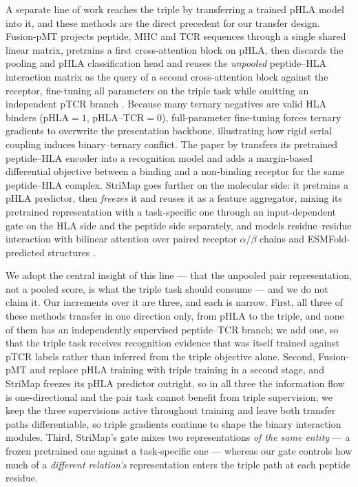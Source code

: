 \documentclass[webpdf,modern,large,namedate]{oup-authoring-template}
\theoremstyle{thmstyleone}
\theoremstyle{thmstyletwo}
\theoremstyle{thmstylethree}
\newcommand{\PH}{pHLA}
\newcommand{\PT}{pTCR}
\newcommand{\PHT}{pHLA--TCR}
\begin{document}
A separate line of work reaches the triple by transferring a trained \PH{}
model into it, and these methods are the direct precedent for our transfer
design. Fusion-pMT projects peptide, MHC and TCR sequences through a single
shared linear matrix, pretrains a first cross-attention block on \PH{}, then
discards the pooling and \PH{} classification head and reuses the
\emph{unpooled} peptide--HLA interaction matrix as the query of a second
cross-attention block against the receptor, fine-tuning all parameters on the
triple task while omitting an independent \PT{} branch \citep{ma2025fusionpmt}.
Because many ternary negatives are valid HLA binders (\PH{}$=1$, \PHT{}$=0$),
full-parameter fine-tuning forces ternary gradients to overwrite the
presentation backbone, illustrating how rigid serial coupling induces
binary--ternary conflict. The
paper by \citet{niu2025attention} transfers its pretrained peptide--HLA encoder
into a recognition model and adds a margin-based differential objective between
a binding and a non-binding receptor for the same peptide--HLA complex. StriMap
goes further on the molecular side: it pretrains a \PH{} predictor, then
\emph{freezes} it and reuses it as a feature aggregator, mixing its pretrained
representation with a task-specific one through an input-dependent gate on the
HLA side and the peptide side separately, and models residue--residue
interaction with bilinear attention over paired receptor $\alpha$/$\beta$
chains and ESMFold-predicted structures \citep{cao2026strimap}.

We adopt the central insight of this line --- that the unpooled pair
representation, not a pooled score, is what the triple task should consume ---
and we do not claim it. Our increments over it are three, and each is narrow.
First, all three of these methods transfer in one direction only, from \PH{} to
the triple, and none of them has an independently supervised peptide--TCR
branch; we add one, so that the triple task receives recognition evidence that
was itself trained against \PT{} labels rather than inferred from the triple
objective alone. Second, Fusion-pMT and \citet{niu2025attention} replace \PH{}
training with triple training in a second stage, and StriMap freezes its \PH{}
predictor outright, so in all three the information flow is one-directional and
the pair task cannot benefit from triple supervision; we keep the three
supervisions active throughout training and leave both transfer paths
differentiable, so triple gradients continue to shape the binary interaction
modules. Third, StriMap's gate mixes two representations \emph{of the same
entity} --- a frozen pretrained one against a task-specific one --- whereas our
gate controls how much of a \emph{different relation's} representation enters
the triple path at each peptide residue.
\end{document}
